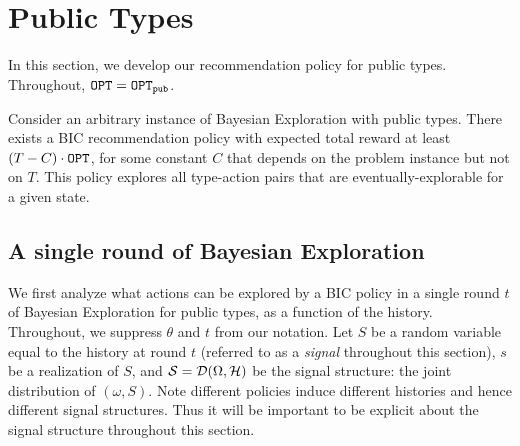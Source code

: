 
\section{Public Types}
\label{sec:public}

In this section, we develop our recommendation policy for public types. Throughout, $\mathtt{OPT} = \mathtt{OPT}_{\mathtt{pub}}$.

\begin{theorem}
\label{thm:public}
Consider an arbitrary instance of Bayesian Exploration with public types.
There exists a BIC recommendation policy with expected total reward at least $\left(T - C \right) \cdot \mathtt{OPT}$, for some constant $C$ that depends on the problem instance but not on $T$. This policy explores all type-action pairs that are eventually-explorable for a given state.
\end{theorem}

\subsection{A single round of Bayesian Exploration}
\label{sec:public_single}

We first analyze what actions can be explored by a BIC policy in a single round $t$ of Bayesian Exploration for public types, as a function of the history. Throughout, we suppress $\theta$ and $t$ from our notation.
Let $S$ be a random variable equal to the history at round $t$ (referred to as a {\em signal} throughout this section), $s$ be a realization of $S$, and $\mathcal{S}=\mathcal{D}(\Omega,\mathcal{H})$ be the signal structure: the joint distribution of $(\omega,S)$.  Note different policies induce different histories and hence different signal structures.  Thus it will be important to be explicit about the signal structure throughout this section.

%

